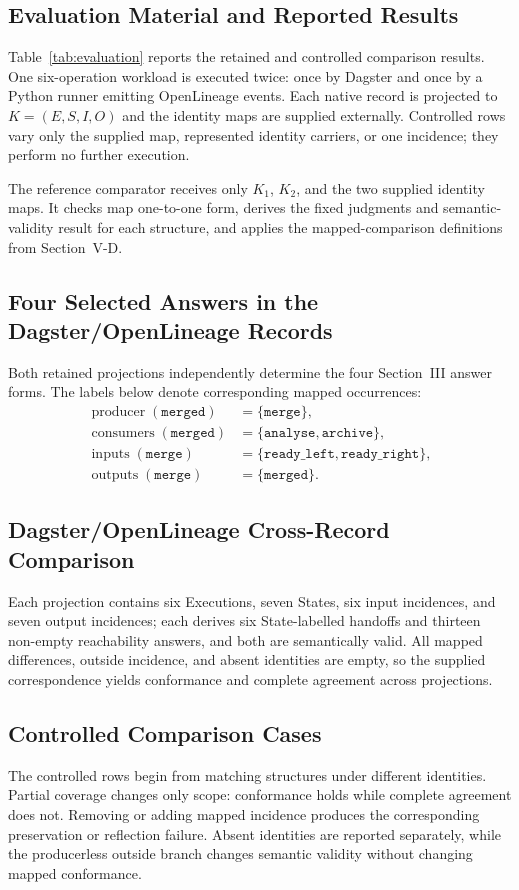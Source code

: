\documentclass[conference]{IEEEtran}
\theoremstyle{tideproposition}
\begin{document}
\subsection{Evaluation Material and Reported Results}
Table~\ref{tab:evaluation} reports the retained and controlled comparison results.
One six-operation workload is executed twice: once by Dagster and once by a Python runner emitting OpenLineage events. Each native record is projected to $K=(E,S,I,O)$ and the identity maps are supplied externally. Controlled rows vary only the supplied map, represented identity carriers, or one incidence; they perform no further execution.

The reference comparator receives only $K_1$, $K_2$, and the two supplied identity maps. It checks map one-to-one form, derives the fixed judgments and semantic-validity result for each structure, and applies the mapped-comparison definitions from Section~V-D.

\subsection{Four Selected Answers in the Dagster/OpenLineage Records}
Both retained projections independently determine the four Section~III answer forms. The labels below denote corresponding mapped occurrences:
\begin{align*}
\operatorname{producer}(\texttt{merged})
   &= \{\texttt{merge}\},\\
\operatorname{consumers}(\texttt{merged})
   &= \{\texttt{analyse},\texttt{archive}\},\\
\operatorname{inputs}(\texttt{merge})
   &= \{\texttt{ready\_left},\texttt{ready\_right}\},\\
\operatorname{outputs}(\texttt{merge})
   &= \{\texttt{merged}\}.
\end{align*}

\subsection{Dagster/OpenLineage Cross-Record Comparison}
Each projection contains six Executions, seven States, six input incidences, and seven output incidences; each derives six State-labelled handoffs and thirteen non-empty reachability answers, and both are semantically valid. All mapped differences, outside incidence, and absent identities are empty, so the supplied correspondence yields conformance and complete agreement across projections.

\subsection{Controlled Comparison Cases}
The controlled rows begin from matching structures under different identities. Partial coverage changes only scope: conformance holds while complete agreement does not. Removing or adding mapped incidence produces the corresponding preservation or reflection failure. Absent identities are reported separately, while the producerless outside branch changes semantic validity without changing mapped conformance.
\end{document}
